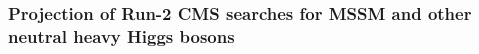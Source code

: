 \subsubsection{Projection of Run-2 CMS searches for MSSM and other neutral heavy Higgs bosons}\label{sec:CMShtt}


\newcommand{\GeV}{\ensuremath{\text{GeV}\xspace}}
\newcommand{\TeV}{\ensuremath{\text{TeV}\xspace}}






